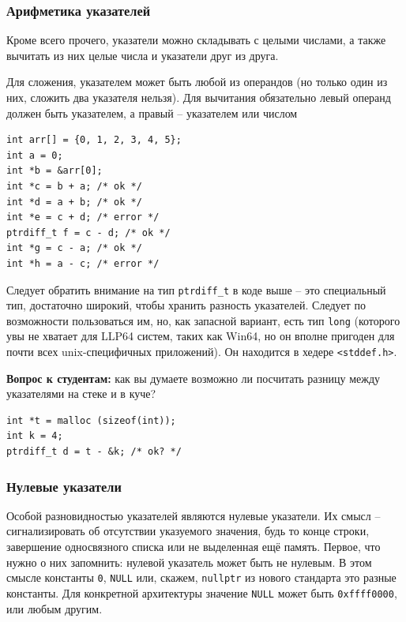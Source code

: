 \documentclass[a4paper,12pt,oneside]{article}
\newif\ifanswers
\begin{document}
\subsubsection{Арифметика указателей}

Кроме всего прочего, указатели можно складывать с целыми числами, а также вычитать из них целые числа и указатели друг из друга.

Для сложения, указателем может быть любой из операндов (но только один из них, сложить два указателя нельзя). Для вычитания обязательно левый операнд должен быть указателем, а правый -- указателем или числом

\begin{lstlisting}
int arr[] = {0, 1, 2, 3, 4, 5};
int a = 0; 
int *b = &arr[0];
int *c = b + a; /* ok */
int *d = a + b; /* ok */
int *e = c + d; /* error */
ptrdiff_t f = c - d; /* ok */
int *g = c - a; /* ok */
int *h = a - c; /* error */
\end{lstlisting}

Следует обратить внимание на тип \lstinline!ptrdiff_t! в коде выше -- это специальный тип, достаточно широкий, чтобы хранить разность указателей. Следует по возможности пользоваться им, но, как запасной вариант, есть тип \lstinline!long! (которого увы не хватает для LLP64 систем, таких как Win64, но он вполне пригоден для почти всех unix-специфичных приложений). Он находится в хедере \lstinline!<stddef.h>!.

\textbf{Вопрос к студентам:} как вы думаете возможно ли посчитать разницу между указателями на стеке и в куче?

\begin{lstlisting}
int *t = malloc (sizeof(int));
int k = 4;
ptrdiff_t d = t - &k; /* ok? */
\end{lstlisting}

\ifanswers
Правильный ответ: разумеется да, адресная арифметика по стандарту прозрачна относительно того где расположена память до тех пор, пока все влезает в \lstinline!ptrdiff_t!.
\fi

\subsubsection{Нулевые указатели}\label{NullPointers}

Особой разновидностью указателей являются нулевые указатели. Их смысл -- сигнализировать об отсутствии указуемого значения, будь то конце строки, завершение односвязного списка или не выделенная ещё память. Первое, что нужно о них запомнить: нулевой указатель может быть не нулевым. В этом смысле константы \lstinline!0!, \lstinline!NULL! или, скажем, \lstinline!nullptr! из нового стандарта это разные константы. Для конкретной архитектуры значение \lstinline!NULL! может быть \lstinline!0xffff0000!, или любым другим.
\end{document}
